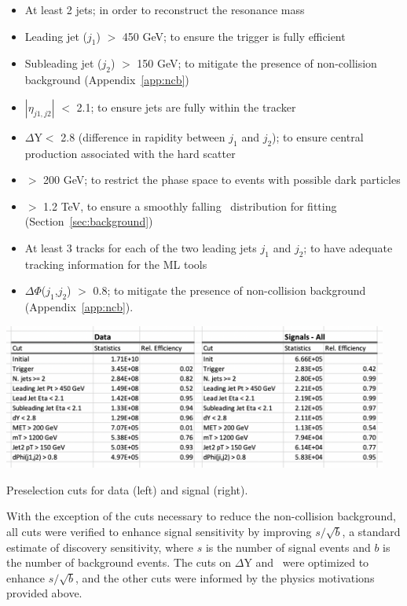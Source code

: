 \begin{itemize}
\item At least 2 jets; in order to reconstruct the resonance mass
\item Leading jet ($j_1$) \pt $>$ 450 GeV; to ensure the trigger is fully efficient
\item Subleading jet ($j_2$) \pt $>$ 150 GeV; to mitigate the presence of non-collision background (Appendix~\ref{app:ncb})
\item $|\eta_{j1,j2}|$ $<$ 2.1; to ensure jets are fully within the tracker
\item $\Delta$Y$<$ 2.8 (difference in rapidity between $j_1$ and $j_2$); to ensure central production associated with the hard scatter  
\item \met $>$ 200 GeV; to restrict the phase space to events with possible dark particles 
\item \mt $>$ 1.2 TeV, to ensure a smoothly falling \mt~distribution for fitting (Section~\ref{sec:background})
\item At least 3 tracks for each of the two leading jets $j_1$ and $j_2$; to have adequate tracking information for the ML tools
\item $\Delta\Phi$($j_1$,$j_2$) $>$ 0.8; to mitigate the presence of non-collision background (Appendix~\ref{app:ncb}).
\end{itemize}

\begin{table}[!htbp]
\centering
   \includegraphics[width=0.95\textwidth]{figures/eventsel/preselection/presel_cutflow}
    \caption{Preselection cuts for data (left) and signal (right).
    \label{fig:presel_cutflow}}
\end{table}

With the exception of the cuts necessary to reduce the non-collision background, all cuts were verified to enhance signal sensitivity by improving $s/\sqrt{b}$, a standard estimate of discovery sensitivity, where $s$ is the number of signal events and $b$ is the number of background events. The cuts on $\Delta$Y and \met~were optimized to enhance $s/\sqrt{b}$, and the other cuts were informed by the physics motivations provided above. \par

